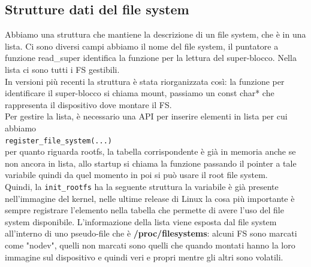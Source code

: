\documentclass[12pt, oneside]{extbook}
\begin{document}
\subsection{Strutture dati del file system}
Abbiamo una struttura che mantiene la descrizione di un file system, che è in una lista. Ci sono diversi campi
abbiamo il nome del file system, il puntatore a funzione read\_super identifica la funzione per la lettura del super-blocco. Nella lista ci sono tutti i FS gestibili.\\In versioni più recenti la struttura è stata riorganizzata così:
la funzione per identificare il super-blocco si chiama mount, passiamo un const char* che rappresenta il dispositivo dove montare il FS.\\Per gestire la lista, è necessario una API per inserire elementi in lista per cui abbiamo\\ \texttt{register\_file\_system(...)}\\ per quanto riguarda rootfs, la tabella corrispondente è già in memoria anche se non ancora in lista, allo startup si chiama la funzione passando il pointer a tale variabile quindi da quel momento in poi si può usare il root file system.\\Quindi, la \texttt{init\_rootfs} ha la seguente struttura
la variabile è già presente nell'immagine del kernel, nelle ultime release di Linux la cosa più importante è sempre registrare l'elemento nella tabella che permette di avere l'uso del file system disponibile.
L'informazione della lista viene esposta dal file system all'interno di uno pseudo-file che è \textbf{/proc/filesystems}: alcuni FS sono marcati come "nodev", quelli non marcati sono quelli che quando montati hanno la loro immagine sul dispositivo e quindi veri e propri mentre gli altri sono volatili.
\end{document}
